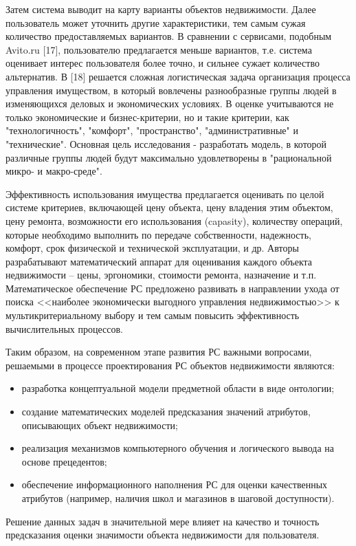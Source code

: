 \documentclass[a4paper,14pt,openany,final]{extreport} %
\begin{document}
Затем система выводит на карту варианты объектов недвижимости. Далее пользователь может уточнить другие характеристики, тем самым сужая количество предоставляемых вариантов. В сравнении с сервисами, подобным Avito.ru [17], пользователю предлагается меньше вариантов, т.е. система оценивает интерес пользователя более точно, и сильнее сужает количество альтернатив.
В [18] решается сложная логистическая задача организация процесса управления имуществом, в который вовлечены разнообразные группы людей в изменяющихся деловых и экономических условиях. В оценке учитываются не только экономические и бизнес-критерии, но и такие критерии, как "технологичность", "комфорт", "пространство", "административные" и "технические". Основная цель исследования - разработать модель, в которой различные группы людей будут максимально удовлетворены в "рациональной микро- и макро-среде".

Эффективность использования имущества предлагается оценивать по целой системе критериев, включающей цену объекта, цену владения этим объектом, цену ремонта, возможности его использования (capasity), количеству операций, которые необходимо выполнить по передаче собственности, надежность, комфорт, срок физической и технической эксплуатации, и др. Авторы разрабатывают математический аппарат для оценивания каждого объекта недвижимости – цены, эргономики, стоимости ремонта, назначение и т.п. Математическое обеспечение РС предложено развивать в направлении ухода от поиска <<наиболее экономически выгодного управления недвижимостью>> к мультикритериальному выбору и тем самым повысить эффективность вычислительных процессов.


Таким образом, на современном этапе развития РС важными вопросами, решаемыми в процессе проектирования РС объектов недвижимости являются:
\begin{itemize}
\item разработка концептуальной модели предметной области в виде
  онтологии;
\item создание математических моделей предсказания значений атрибутов, описывающих объект недвижимости;

\item реализация механизмов компьютерного обучения и логического вывода на основе прецедентов;

\item обеспечение информационного наполнения РС для оценки качественных атрибутов (например, наличия школ и магазинов в шаговой доступности).
\end{itemize}
Решение данных задач в значительной мере влияет на качество и точность предсказания оценки значимости объекта недвижимости для пользователя.
\end{document}

